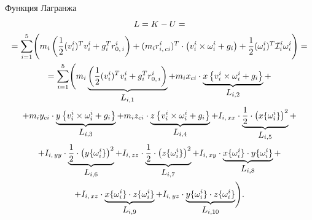 Функция Лагранжа
\begin{gather}
    L = K - U = \notag
    \\
    = \sum_{i=1}^5 \Biggl( m_i \left( \frac{1}{2} (v^i_i)^T v^i_i + g_i^T r^i_{0,\,i} \right) + (m_ir^i_{i,\,ci})^T \cdot \left( v^i_i \times \omega^i_i + g_i \right) + \frac{1}{2} (\omega^i_i)^T \mathcal{I}^{i}_i \omega^i_i \Biggr) = \notag
    \\
    = \sum_{i=1}^5 \Biggl( m_i \underbrace{\left( \frac{1}{2} (v^i_i)^T v^i_i + g_i^T r^i_{0,\,i} \right)}_{\displaystyle L_{i,1}} + m_i x_{ci} \cdot \underbrace{x\left\{ v^i_i \times \omega^i_i + g_i \right\}}_{\displaystyle L_{i,2}} + \notag
    \\
    + m_i y_{ci} \cdot \underbrace{y\left\{ v^i_i \times \omega^i_i + g_i \right\}}_{\displaystyle L_{i,3}} + m_i z_{ci} \cdot \underbrace{z\left\{ v^i_i \times \omega^i_i + g_i \right\}}_{\displaystyle L_{i,4}} + I_{i,\,xx} \cdot \underbrace{\frac{1}{2} \cdot \bigl(x\{\omega^i_i\}\bigr)^2}_{\displaystyle L_{i,5}} +\notag
    \\
    + I_{i,\,yy} \cdot \underbrace{\frac{1}{2} \cdot \bigl(y\{\omega^i_i\}\bigr)^2}_{\displaystyle L_{i,6}} + I_{i,\,zz} \cdot \underbrace{\frac{1}{2} \cdot \bigl(z\{\omega^i_i\}\bigr)^2}_{\displaystyle L_{i,7}} + I_{i,\,xy} \cdot \underbrace{x\{\omega^i_i\} \cdot y\{\omega^i_i\}}_{\displaystyle L_{i,8}} +\notag
    \\
    + I_{i,\,xz} \cdot \underbrace{x\{\omega^i_i\} \cdot z\{\omega^i_i\}}_{\displaystyle L_{i,9}} + I_{i,\,yz} \cdot \underbrace{y\{\omega^i_i\} \cdot z\{\omega^i_i\}}_{\displaystyle L_{i,10}}\Biggr) \ldotp
\end{gather}

